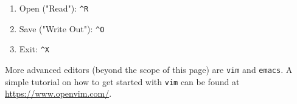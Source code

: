 \begin{enumerate}
\item Open ("Read"): \verb|^R|
\item Save ("Write Out"): \verb|^O|
\item Exit: \verb|^X|
\end{enumerate}

More advanced editors (beyond the scope of this page) are \verb|vim| and \verb|emacs|.
A simple tutorial on how to get started with \verb|vim| can be found at \url{https://www.openvim.com/}.
